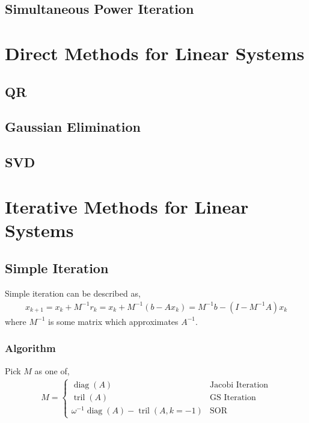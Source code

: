 \documentclass[12pt]{article}
\begin{document}
\subsection{Simultaneous Power Iteration}



\pagebreak
\section{Direct Methods for Linear Systems}
\subsection{QR}

\subsection{Gaussian Elimination}
\subsection{SVD}


\pagebreak
\section{Iterative Methods for Linear Systems}
\subsection{Simple Iteration}

Simple iteration can be described as,
\begin{align*}
    x_{k+1}= x_k+M^{-1} r_k = x_k + M^{-1}(b-Ax_{k}) = M^{-1}b - (I-M^{-1}A)x_{k}
\end{align*}
where \( M^{-1} \) is some matrix which approximates \( A^{-1} \).

\subsubsection{Algorithm}
Pick \( M \) as one of,
\begin{align*}
    M = \begin{cases}
    \operatorname{diag}(A) & \text{Jacobi Iteration}\\
    \operatorname{tril}(A) & \text{GS Iteration}\\
    \omega^{-1}\operatorname{diag}(A) - \operatorname{tril}(A,k=-1) & \text{SOR}
\end{cases}
\end{align*}
\end{document}
